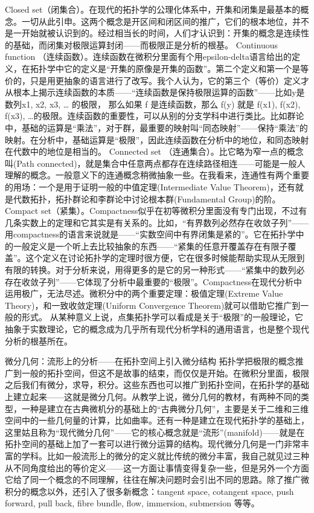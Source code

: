 Closed set（闭集合）。在现代的拓扑学的公理化体系中，开集和闭集是最基本的概念。一切从此引申。这两个概念是开区间和闭区间的推广，它们的根本地位，并不是一开始就被认识到的。经过相当长的时间，人们才认识到：开集的概念是连续性的基础，而闭集对极限运算封闭——而极限正是分析的根基。
Continuous function （连续函数）。连续函数在微积分里面有个用epsilon-delta语言给出的定义，在拓扑学中它的定义是“开集的原像是开集的函数”。第二个定义和第一个是等价的，只是用更抽象的语言进行了改写。我个人认为，它的第三个（等价）定义才从根本上揭示连续函数的本质——“连续函数是保持极限运算的函数”——比如y是数列x1, x2, x3, … 的极限， 那么如果 f 是连续函数，那么 f(y) 就是 f(x1), f(x2), f(x3), …的极限。连续函数的重要性，可以从别的分支学科中进行类比。比如群论中，基础的运算是“乘法”，对于群，最重要的映射叫“同态映射”——保持“乘法”的映射。在分析中，基础运算是“极限”，因此连续函数在分析中的地位，和同态映射在代数中的地位是相当的。
Connected set （连通集合）。比它略为窄一点的概念叫(Path connected)，就是集合中任意两点都存在连续路径相连——可能是一般人理解的概念。一般意义下的连通概念稍微抽象一些。在我看来，连通性有两个重要的用场：一个是用于证明一般的中值定理(Intermediate Value Theorem)，还有就是代数拓扑，拓扑群论和李群论中讨论根本群(Fundamental Group)的阶。
Compact set（紧集）。Compactness似乎在初等微积分里面没有专门出现，不过有几条实数上的定理和它其实是有关系的。比如，“有界数列必然存在收敛子列”——用compactness的语言来说就是——“实数空间中有界闭集是紧的”。它在拓扑学中的一般定义是一个听上去比较抽象的东西——“紧集的任意开覆盖存在有限子覆盖”。这个定义在讨论拓扑学的定理时很方便，它在很多时候能帮助实现从无限到有限的转换。对于分析来说，用得更多的是它的另一种形式——“紧集中的数列必存在收敛子列”——它体现了分析中最重要的“极限”。Compactness在现代分析中运用极广，无法尽述。微积分中的两个重要定理：极值定理(Extreme Value Theory)，和一致收敛定理(Uniform Convergence Theorem)就可以借助它推广到一般的形式。
从某种意义上说，点集拓扑学可以看成是关于“极限”的一般理论，它抽象于实数理论，它的概念成为几乎所有现代分析学科的通用语言，也是整个现代分析的根基所在。

微分几何：流形上的分析——在拓扑空间上引入微分结构
拓扑学把极限的概念推广到一般的拓扑空间，但这不是故事的结束，而仅仅是开始。在微积分里面，极限之后我们有微分，求导，积分。这些东西也可以推广到拓扑空间，在拓扑学的基础上建立起来——这就是微分几何。从教学上说，微分几何的教材，有两种不同的类型，一种是建立在古典微机分的基础上的“古典微分几何”，主要是关于二维和三维空间中的一些几何量的计算，比如曲率。还有一种是建立在现代拓扑学的基础上，这里姑且称为“现代微分几何”——它的核心概念就是“流形”(manifold)——就是在拓扑空间的基础上加了一套可以进行微分运算的结构。现代微分几何是一门非常丰富的学科。比如一般流形上的微分的定义就比传统的微分丰富，我自己就见过三种从不同角度给出的等价定义——这一方面让事情变得复杂一些，但是另外一个方面它给了同一个概念的不同理解，往往在解决问题时会引出不同的思路。除了推广微积分的概念以外，还引入了很多新概念：tangent space, cotangent space, push forward, pull back, fibre bundle, flow, immersion, submersion 等等。

